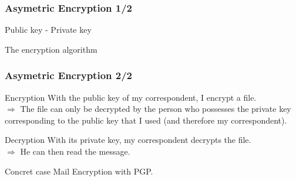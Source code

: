 \begin{frame}
\frametitle{Asymetric Encryption 1/2}

\begin{block}{Public key - Private key}
\end{block}
	
\begin{block}{The encryption algorithm}
\end{block}

\end{frame}

\begin{frame}
\frametitle{Asymetric Encryption 2/2}

\begin{block}{Encryption}
With the public key of my correspondent, I encrypt a file.
\\$\Rightarrow$ The file can only be decrypted by the person who possesses the private key corresponding to the public key that I used (and therefore my correspondent).
\end{block}

\begin{block}{Decryption}
With its private key, my correspondent decrypts the file.
\\
$\Rightarrow$ He can then read the message.
\end{block}

\begin{block}{Concret case}
Mail Encryption with PGP.
\end{block}
\end{frame}

